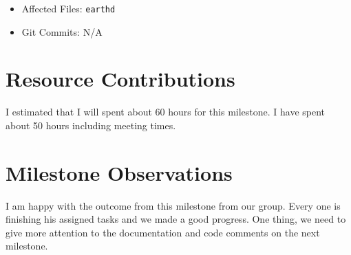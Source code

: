 \begin{itemize}
\begin{itemize}
            \item Affected Files: \texttt{earthd}
            \item Git Commits: N/A
        \end{itemize}
    \end{itemize}
\newpage
\section*{Resource Contributions}
I estimated that I will spent about 60 hours for this milestone. I have spent about 50 hours including meeting times. 


\section*{Milestone Observations}
I am happy with the outcome from this milestone from our group. Every one is finishing his assigned tasks and we made a good progress. One thing, we need to give more attention to the documentation and code comments on the next milestone.

